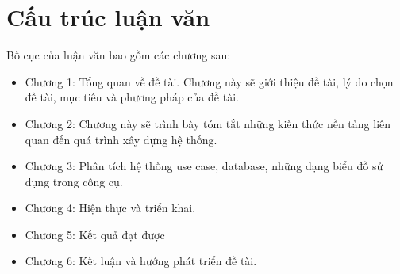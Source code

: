 \section{Cấu trúc luận văn}
Bố cục của luận văn bao gồm các chương sau:
\begin{itemize}
	\item Chương 1: Tổng quan về đề tài. Chương này sẽ giới thiệu đề tài, lý do chọn đề tài, mục tiêu và phương pháp của đề tài.
	\item Chương 2: Chương này sẽ trình bày tóm tắt những kiến thức nền tảng liên quan đến quá trình xây dựng hệ thống.
	\item Chương 3: Phân tích hệ thống use case, database, những dạng biểu đồ sử dụng trong công cụ.
	\item Chương 4: Hiện thực và triển khai.
	\item Chương 5: Kết quả đạt được
	\item Chương 6: Kết luận và hướng phát triển đề tài.
\end{itemize}